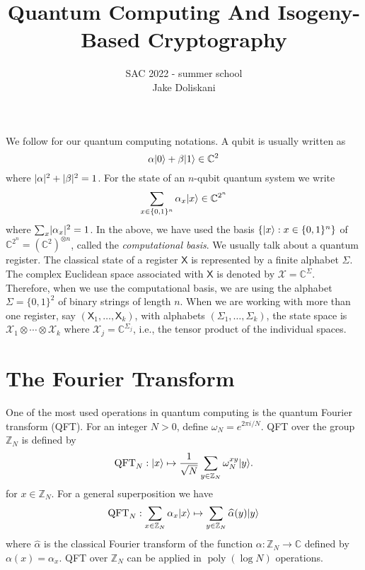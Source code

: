 \documentclass[11pt]{article}
\title{Quantum Computing And Isogeny-Based Cryptography}
\author{
    SAC 2022 - summer school \\
	Jake Doliskani
}
\date{}
\theoremstyle{plain}
\theoremstyle{definition}
\DeclareMathOperator{\poly}{poly}
\DeclarePairedDelimiter{\abs}{\lvert}{\rvert}
\DeclarePairedDelimiter{\ket}{\lvert}{\rangle}
\def\C{\mathbb{C}}
\def\Z{\mathbb{Z}}
\def\X{\mathcal{X}}
\begin{document}
\maketitle




We follow \cite{watrous2018theory} for our quantum computing notations. A qubit is usually written as
\[ \alpha\ket{0} + \beta\ket{1} \in \C^2 \]
where $\abs{\alpha}^2 + \abs{\beta}^2 = 1$. For the state of an $n$-qubit quantum system we write
\[ \sum_{x \in \{0, 1\}^n} \alpha_x \ket{x} \in \C^{2^n} \]
where $\sum_x \abs{\alpha_x}^2 = 1$. In the above, we have used the basis $\{ \ket{x} : x \in \{0, 1\}^n \}$ of $\C^{2^n} = (\C^2)^{\otimes n}$, called the \textit{computational basis}. We usually talk about a quantum register. The classical state  of a register $\mathsf{X}$ is represented by a finite alphabet $\Sigma$. The complex Euclidean space associated with $\mathsf{X}$ is denoted by $\X = \C^\Sigma$. Therefore, when we use the computational basis, we are using the alphabet $\Sigma = \{0, 1\}^2$ of binary strings of length $n$. When we are working with more than one register, say $(\mathsf{X}_1, \dots, \mathsf{X}_k)$, with alphabets $(\Sigma_1, \dots, \Sigma_k)$, the state space is $\X_1 \otimes \cdots \otimes \X_k$ where $\X_j = \C^{\Sigma_j}$, i.e., the tensor product of the individual spaces.  




\section{The Fourier Transform}

One of the most used operations in quantum computing is the quantum Fourier transform (QFT). For an integer $N > 0$, define $\omega_N = e^{2\pi i / N}$. QFT over the group $\Z_N$ is defined by
\[ \mathrm{QFT}_N: \ket{x} \mapsto \frac{1}{\sqrt{N}} \sum_{y \in \Z_N} \omega_N^{xy} \ket{y}. \]
for $x \in \Z_N$. For a general superposition we have
\[ \mathrm{QFT}_N: \sum_{x \in \Z_N} \alpha_x \ket{x} \mapsto \sum_{y \in \Z_N} \widehat{\alpha}(y) \ket{y} \]
where $\widehat{\alpha}$ is the classical Fourier transform of the function $\alpha: \Z_N \rightarrow \C$ defined by $\alpha(x) = \alpha_x$. QFT over $\Z_N$ can be applied in $\poly(\log N)$ operations.
\end{document}
